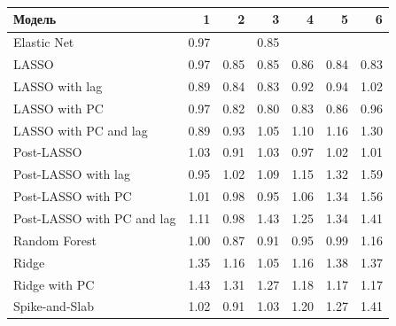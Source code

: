 \documentclass[c, dvipsnames]{beamer}  %
\begin{document}
 \frametitle{\insertsection} 
\framesubtitle{\insertsubsection}
 \begin{frame}
\begin{table}[ht]
\small
\centering
\begin{tabular}{lrrrrrr}
  \hline
Модель & 1 & 2 & 3 & 4 & 5 & 6 \\ 
  \hline
Elastic Net & 0.97 &  & 0.85 &  &  &  \\ 
  LASSO & 0.97 & 0.85 & 0.85 & 0.86 & 0.84 & 0.83 \\ 
  LASSO with lag & 0.89 & 0.84 & 0.83 & 0.92 & 0.94 & 1.02 \\ 
 LASSO with PC & 0.97 & 0.82 & 0.80 & 0.83 & 0.86 & 0.96 \\ 
 LASSO with PC and lag &0.89 & 0.93 & 1.05 & 1.10 & 1.16 & 1.30 \\ 
  Post-LASSO & 1.03 & 0.91 & 1.03 & 0.97 & 1.02 & 1.01 \\ 
 Post-LASSO with lag & 0.95 & 1.02 & 1.09 & 1.15 & 1.32 & 1.59 \\ 
  Post-LASSO with PC & 1.01 & 0.98 & 0.95 & 1.06 & 1.34 & 1.56 \\ 
  Post-LASSO with PC  and lag & 1.11 & 0.98 & 1.43 & 1.25 & 1.34 & 1.41 \\ 
  Random Forest & 1.00 & 0.87 & 0.91 & 0.95 & 0.99 & 1.16 \\ 
  Ridge & 1.35 & 1.16 & 1.05 & 1.16 & 1.38 & 1.37 \\ 
  Ridge with PC & 1.43 & 1.31 & 1.27 & 1.18 & 1.17 & 1.17 \\ 
   Spike-and-Slab & 1.02 & 0.91 & 1.03 & 1.20 & 1.27 & 1.41 \\
   \hline
\end{tabular}
\end{table}
\end{frame}
\end{document}
